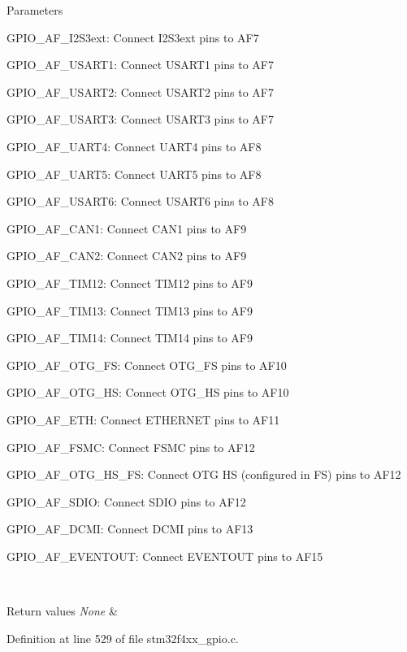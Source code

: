 \begin{DoxyParams}{Parameters}
\begin{DoxyItemize}
\item G\+P\+I\+O\+\_\+\+A\+F\+\_\+\+I2\+S3ext\+: Connect I2\+S3ext pins to A\+F7 \item G\+P\+I\+O\+\_\+\+A\+F\+\_\+\+U\+S\+A\+R\+T1\+: Connect U\+S\+A\+R\+T1 pins to A\+F7 \item G\+P\+I\+O\+\_\+\+A\+F\+\_\+\+U\+S\+A\+R\+T2\+: Connect U\+S\+A\+R\+T2 pins to A\+F7 \item G\+P\+I\+O\+\_\+\+A\+F\+\_\+\+U\+S\+A\+R\+T3\+: Connect U\+S\+A\+R\+T3 pins to A\+F7 \item G\+P\+I\+O\+\_\+\+A\+F\+\_\+\+U\+A\+R\+T4\+: Connect U\+A\+R\+T4 pins to A\+F8 \item G\+P\+I\+O\+\_\+\+A\+F\+\_\+\+U\+A\+R\+T5\+: Connect U\+A\+R\+T5 pins to A\+F8 \item G\+P\+I\+O\+\_\+\+A\+F\+\_\+\+U\+S\+A\+R\+T6\+: Connect U\+S\+A\+R\+T6 pins to A\+F8 \item G\+P\+I\+O\+\_\+\+A\+F\+\_\+\+C\+A\+N1\+: Connect C\+A\+N1 pins to A\+F9 \item G\+P\+I\+O\+\_\+\+A\+F\+\_\+\+C\+A\+N2\+: Connect C\+A\+N2 pins to A\+F9 \item G\+P\+I\+O\+\_\+\+A\+F\+\_\+\+T\+I\+M12\+: Connect T\+I\+M12 pins to A\+F9 \item G\+P\+I\+O\+\_\+\+A\+F\+\_\+\+T\+I\+M13\+: Connect T\+I\+M13 pins to A\+F9 \item G\+P\+I\+O\+\_\+\+A\+F\+\_\+\+T\+I\+M14\+: Connect T\+I\+M14 pins to A\+F9 \item G\+P\+I\+O\+\_\+\+A\+F\+\_\+\+O\+T\+G\+\_\+\+FS\+: Connect O\+T\+G\+\_\+\+FS pins to A\+F10 \item G\+P\+I\+O\+\_\+\+A\+F\+\_\+\+O\+T\+G\+\_\+\+HS\+: Connect O\+T\+G\+\_\+\+HS pins to A\+F10 \item G\+P\+I\+O\+\_\+\+A\+F\+\_\+\+E\+TH\+: Connect E\+T\+H\+E\+R\+N\+ET pins to A\+F11 \item G\+P\+I\+O\+\_\+\+A\+F\+\_\+\+F\+S\+MC\+: Connect F\+S\+MC pins to A\+F12 \item G\+P\+I\+O\+\_\+\+A\+F\+\_\+\+O\+T\+G\+\_\+\+H\+S\+\_\+\+FS\+: Connect O\+TG HS (configured in FS) pins to A\+F12 \item G\+P\+I\+O\+\_\+\+A\+F\+\_\+\+S\+D\+IO\+: Connect S\+D\+IO pins to A\+F12 \item G\+P\+I\+O\+\_\+\+A\+F\+\_\+\+D\+C\+MI\+: Connect D\+C\+MI pins to A\+F13 \item G\+P\+I\+O\+\_\+\+A\+F\+\_\+\+E\+V\+E\+N\+T\+O\+UT\+: Connect E\+V\+E\+N\+T\+O\+UT pins to A\+F15 \end{DoxyItemize}
\\
\hline
\end{DoxyParams}

\begin{DoxyRetVals}{Return values}
{\em None} & \\
\hline
\end{DoxyRetVals}


Definition at line 529 of file stm32f4xx\+\_\+gpio.\+c.

